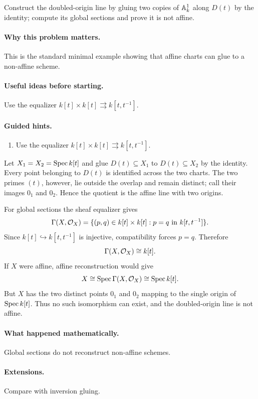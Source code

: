 \begin{problem}\label{prob:vi20-p07}
Construct the doubled-origin line by gluing two copies of $\mathbb A^1_k$ along $D(t)$ by the identity; compute its global sections and prove it is not affine.
\end{problem}

\ifdefined\FullProblemDossiers
\paragraph{Why this problem matters.}
This is the standard minimal example showing that affine charts can glue to a non-affine scheme.

\paragraph{Useful ideas before starting.}
Use the equalizer $k[t]\times k[t]\rightrightarrows k[t,t^{-1}]$.

\paragraph{Guided hints.}
\begin{enumerate}
\item Use the equalizer $k[t]\times k[t]\rightrightarrows k[t,t^{-1}]$.
\end{enumerate}

\begin{solution}
Let $X_1=X_2=\operatorname{Spec} k[t]$ and glue $D(t)\subseteq X_1$ to $D(t)\subseteq X_2$ by the identity.  Every point belonging to $D(t)$ is identified across the two charts.  The two primes $(t)$, however, lie outside the overlap and remain distinct; call their images $0_1$ and $0_2$.  Hence the quotient is the affine line with two origins.

For global sections the sheaf equalizer gives
\[
\Gamma(X,\mathcal O_X)
=\{(p,q)\in k[t]\times k[t]:p=q\text{ in }k[t,t^{-1}]\}.
\]
Since $k[t]\hookrightarrow k[t,t^{-1}]$ is injective, compatibility forces $p=q$.  Therefore
\[
\Gamma(X,\mathcal O_X)\cong k[t].
\]
If $X$ were affine, affine reconstruction would give
\[
X\cong\operatorname{Spec}\Gamma(X,\mathcal O_X)\cong\operatorname{Spec} k[t].
\]
But $X$ has the two distinct points $0_1$ and $0_2$ mapping to the single origin of $\operatorname{Spec} k[t]$.  Thus no such isomorphism can exist, and the doubled-origin line is not affine.
\end{solution}


\paragraph{What happened mathematically.}
Global sections do not reconstruct non-affine schemes.

\paragraph{Extensions.}
Compare with inversion gluing.
\fi
